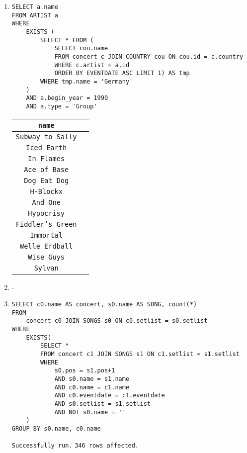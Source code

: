 \documentclass[fleqn]{article}
\begin{document}
\begin{enumerate}
        \item
            \begin{verbatim}
SELECT a.name
FROM ARTIST a
WHERE
    EXISTS (
        SELECT * FROM (
            SELECT cou.name
            FROM concert c JOIN COUNTRY cou ON cou.id = c.country
            WHERE c.artist = a.id
            ORDER BY EVENTDATE ASC LIMIT 1) AS tmp
        WHERE tmp.name = 'Germany'
    )
    AND a.begin_year = 1990
    AND a.type = 'Group'
            \end{verbatim}
            \begin{tabular}{|c|c|}
                \texttt{name} \\
                \toprule
                \texttt{Subway to Sally} \\
                \texttt{Iced Earth} \\
                \texttt{In Flames} \\
                \texttt{Ace of Base} \\
                \texttt{Dog Eat Dog} \\
                \texttt{H-Blockx} \\
                \texttt{And One} \\
                \texttt{Hypocrisy} \\
                \texttt{Fiddler's Green} \\
                \texttt{Immortal} \\
                \texttt{Welle Erdball} \\
                \texttt{Wise Guys} \\
                \texttt{Sylvan} \\
            \end{tabular}

        \item -

        \item
            \begin{verbatim}
SELECT c0.name AS concert, s0.name AS SONG, count(*)
FROM
    concert c0 JOIN SONGS s0 ON c0.setlist = s0.setlist
WHERE
    EXISTS(
        SELECT *
        FROM concert c1 JOIN SONGS s1 ON c1.setlist = s1.setlist
        WHERE
            s0.pos = s1.pos+1
            AND s0.name = s1.name
            AND c0.name = c1.name
            AND c0.eventdate = c1.eventdate
            AND s0.setlist = s1.setlist
            AND NOT s0.name = ''
    )
GROUP BY s0.name, c0.name
            \end{verbatim}
            \texttt{Successfully run.} \texttt{346 rows affected.}
    \end{enumerate}
\end{document}
